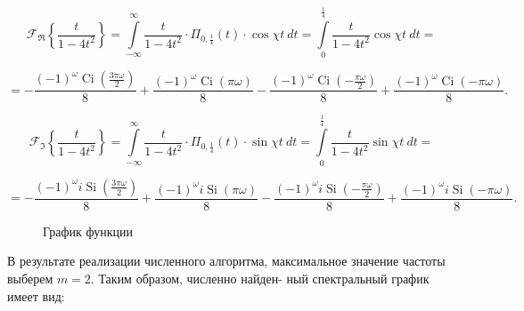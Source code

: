 \documentclass[14pt, titlepage,fleqn]{extarticle}
\DeclareMathOperator{\Ci}{Ci}
\DeclareMathOperator{\Si}{Si}
\begin{document}
\[\mathscr{F}_\Re\left\{\dfrac{t}{1 - 4t^2}\right\} = \int\limits_{-\infty}^{\infty}  \dfrac{t}{1 - 4t^2} \cdot \Pi_{0, \frac{1}{4}}(t) \cdot \cos{\chi t}~dt = \int\limits_{0}^{ \frac{1}{4}}  \dfrac{t}{1 - 4t^2}  \cos{\chi t} ~dt = \]

\[=- \dfrac{(-1)^\omega \Ci{\left(\frac{3\pi \omega}{2}\right)}}{8} + \dfrac{(-1)^\omega \Ci{(\pi \omega)}}{8} - \dfrac{(-1)^\omega \Ci{\left(-\frac{\pi \omega}{2}\right)}}{8} + \dfrac{(-1)^\omega \Ci{(- \pi \omega)}}{8}.\]

\[\mathscr{F}_\Im\left\{\dfrac{t}{1 - 4t^2}\right\} = \int\limits_{-\infty}^{\infty}  \dfrac{t}{1 - 4t^2} \cdot \Pi_{0,\frac{1}{4}}(t) \cdot \sin{\chi t}~dt = \int\limits_{0}^{ \frac{1}{4}}  \dfrac{t}{1 - 4t^2}  \sin{\chi t} ~dt = \]

\[=- \dfrac{(-1)^\omega i\Si{\left(\frac{3\pi \omega}{2}\right)}}{8} + \dfrac{(-1)^\omega i\Si{(\pi \omega)}}{8} - \dfrac{(-1)^\omega i\Si{\left(-\frac{\pi \omega}{2}\right)}}{8} + \dfrac{(-1)^\omega i\Si{(- \pi \omega)}}{8}.\]

\begin{figure}[H]
	\caption{График функции}
\end{figure}


В результате реализации численного алгоритма, максимальное
значение частоты выберем $m = 2$. Таким образом, численно найден-
ный спектральный график имеет вид:
\end{document}

